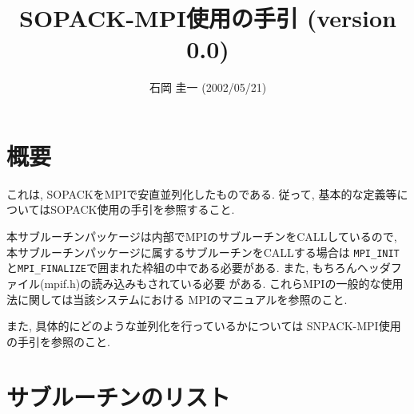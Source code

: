 %
%

\title{SOPACK-MPI使用の手引 (version 0.0)}
\author{石岡 圭一  (2002/05/21)}
\date{}



\maketitle

\section{概要}

これは, SOPACKをMPIで安直並列化したものである.
従って, 基本的な定義等についてはSOPACK使用の手引を参照すること.

本サブルーチンパッケージは内部でMPIのサブルーチンをCALLしているので,
本サブルーチンパッケージに属するサブルーチンをCALLする場合は
{\tt MPI\_INIT}と{\tt MPI\_FINALIZE}で囲まれた枠組の中である必要がある.
また, もちろんヘッダファイル(mpif.h)の読み込みもされている必要
がある. これらMPIの一般的な使用法に関しては当該システムにおける
MPIのマニュアルを参照のこと.
 
また, 具体的にどのような並列化を行っているかについては
SNPACK-MPI使用の手引を参照のこと.


\section{サブルーチンのリスト}

